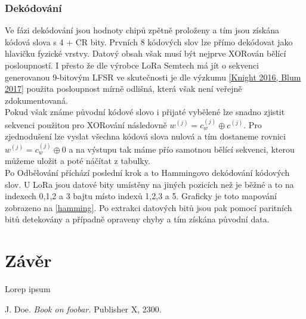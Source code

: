 \documentclass{ctuthesis}
\begin{document}
\subsection{Dekódování}
Ve fázi dekódování jsou hodnoty chipů zpětně proloženy a tím jsou získána kódová slova s 4 + CR bity. Prvních 8 kódových slov lze přímo dekódovat jako hlavičku fyzické vrstvy. Datový obsah však musí být nejprve XORován bělící posloupností. I přesto že dle výrobce LoRa Semtech má jít o sekvenci generovanou 9-bitovým LFSR ve skutečnosti je dle výzkumu \ref{Knight 2016, Blum 2017} použita posloupnost mírně odlišná, která však není veřejně zdokumentovaná.\\
Pokud však známe původní  kódové slovo i přijaté vybělené lze snadno zjistit sekvenci použitou pro XORování následovně
$w^{(j)} = c_w^{(j)} \oplus c^{(j)}$. Pro zjednodušení lze vyslat všechna kódová slova nulová a tím dostaneme rovnici $w^{(j)} = c_w^{(j)} \oplus 0$ a na výstupu tak máme přío samotnou bělící sekvenci, kterou můžeme uložit a poté náčítat z tabulky. \\
Po Odbělování příchází poslední krok a to Hammingovo dekódování kódových slov. U LoRa jsou datové bity umístěny na jiných pozicích než je běžné a to na indexech 0,1,2 a 3 bajtu místo indexů 1,2,3 a 5. Graficky je toto mapování zobrazeno na \ref{hamming}. Po extrakci datových bitů jsou pak pomocí paritních bitů detekovány a případně opraveny chyby a tím získána původní data.




\chapter{Závěr}

Lorep ipsum \cite{doe}

\begin{thebibliography}{1}

 J. Doe. \emph{Book on foobar.} Publisher X,
 2300.

\end{thebibliography}
\end{document}

